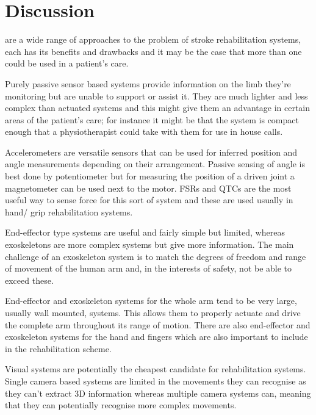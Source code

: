 \documentclass[journal]{IEEEtran}
\begin{document}

\section{Discussion}
 are a wide range of approaches to the problem of stroke rehabilitation systems, 
each has its benefits and drawbacks and it may be the case that more than one 
could be used in a patient's care.

Purely passive sensor based systems provide information on the limb they're 
monitoring but are unable to support or assist it. They are much lighter 
and less complex than actuated systems and this might give them an advantage 
in certain areas of the patient's care; for instance it might be that the 
system is compact enough that  a physiotherapist could take with them for use in house calls.

Accelerometers are versatile sensors that can be used for inferred position and angle 
measurements depending on their arrangement. Passive sensing of angle is best done by 
potentiometer but for measuring the position of a driven joint a magnetometer can 
be used next to the motor. FSRs and QTCs are the most useful way to sense force for 
this sort of system and these are used usually in hand/ grip rehabilitation systems.

End-effector type systems are useful and fairly simple but limited, whereas 
exoskeletons are more complex systems but give more information. The main 
challenge of an exoskeleton system is to match the degrees of freedom and 
range of movement of the human arm and, in the interests of safety, not be 
able to exceed these.

End-effector and exoskeleton systems for the whole arm tend to be very large, 
usually wall mounted, systems. This allows them to properly actuate and drive the 
complete arm throughout its range of motion. There are also end-effector and 
exoskeleton systems for the hand and fingers which are also important to 
include in the rehabilitation scheme.

Visual systems are potentially the cheapest candidate for rehabilitation systems. 
Single camera based systems are limited in the movements they can recognise as 
they can't extract 3D information whereas multiple camera systems can, meaning 
that they can potentially recognise more complex movements.
\end{document}
